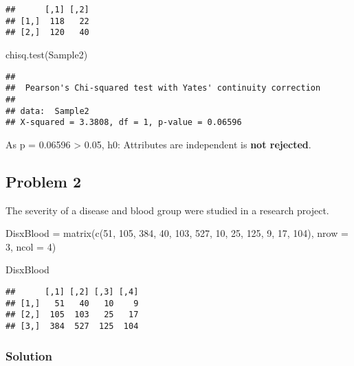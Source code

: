 \documentclass[
]{article}
\newenvironment{Shaded}{\begin{snugshade}}{\end{snugshade}}
\newcommand{\AttributeTok}[1]{\textcolor[rgb]{0.77,0.63,0.00}{#1}}
\newcommand{\DecValTok}[1]{\textcolor[rgb]{0.00,0.00,0.81}{#1}}
\newcommand{\FunctionTok}[1]{\textcolor[rgb]{0.00,0.00,0.00}{#1}}
\newcommand{\NormalTok}[1]{#1}
\newcommand{\OtherTok}[1]{\textcolor[rgb]{0.56,0.35,0.01}{#1}}
\begin{document}
\begin{verbatim}
##      [,1] [,2]
## [1,]  118   22
## [2,]  120   40
\end{verbatim}

\begin{Shaded}
\begin{Highlighting}[]
\FunctionTok{chisq.test}\NormalTok{(Sample2)}
\end{Highlighting}
\end{Shaded}

\begin{verbatim}
## 
##  Pearson's Chi-squared test with Yates' continuity correction
## 
## data:  Sample2
## X-squared = 3.3808, df = 1, p-value = 0.06596
\end{verbatim}

As p = 0.06596 \textgreater{} 0.05, h0: Attributes are independent is
\textbf{not rejected}.

\hypertarget{problem-2-3}{%
\subsection{Problem 2}\label{problem-2-3}}

The severity of a disease and blood group were studied in a research
project.

\begin{Shaded}
\begin{Highlighting}[]
\NormalTok{DisxBlood }\OtherTok{=} \FunctionTok{matrix}\NormalTok{(}\FunctionTok{c}\NormalTok{(}\DecValTok{51}\NormalTok{, }\DecValTok{105}\NormalTok{, }\DecValTok{384}\NormalTok{, }\DecValTok{40}\NormalTok{, }\DecValTok{103}\NormalTok{, }\DecValTok{527}\NormalTok{, }\DecValTok{10}\NormalTok{, }\DecValTok{25}\NormalTok{, }\DecValTok{125}\NormalTok{, }\DecValTok{9}\NormalTok{, }\DecValTok{17}\NormalTok{, }\DecValTok{104}\NormalTok{), }\AttributeTok{nrow =} \DecValTok{3}\NormalTok{, }\AttributeTok{ncol =} \DecValTok{4}\NormalTok{)}

\NormalTok{DisxBlood}
\end{Highlighting}
\end{Shaded}

\begin{verbatim}
##      [,1] [,2] [,3] [,4]
## [1,]   51   40   10    9
## [2,]  105  103   25   17
## [3,]  384  527  125  104
\end{verbatim}

\hypertarget{solution-26}{%
\subsubsection{Solution}\label{solution-26}}
\end{document}
